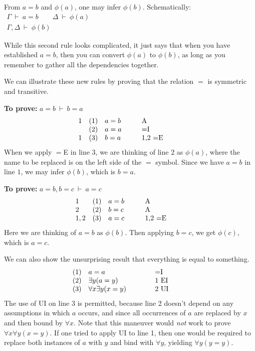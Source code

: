 \bigskip \begin{tcolorbox}[enhanced,width=10cm,title=Equality Elimination ({$=$}E),attach boxed title to top
  left={yshift=-2mm,xshift=4mm},boxed title style={sharp corners}]
  From $a=b$ and $\phi (a)$, one may infer $\phi (b)$.  Schematically:
  $ \begin{array}{c}
       \Gamma\:\vdash\: a=b \qquad \Delta\:\vdash\: \phi (a) \\ \hline
       \Gamma ,\Delta\:\vdash\: \phi (b) \end{array} $
 \end{tcolorbox}
 \noindent While this second rule looks complicated, it just says that
 when you have established $a=b$, then you can convert $\phi (a)$ to
 $\phi (b)$, as long as you remember to gather all the dependencies
 together.

We can illustrate these new rules by proving that the relation $=$ is
symmetric and transitive.

\medskip \noindent \textbf{To prove:} $a=b\:\vdash\: b=a$
\[ \begin{array}{l l >{$}p{1.5cm}<{$} p{2cm}}
     1 & (1) & a=b   & A \\
       & (2) & a=a   & $=$I \\
     1 & (3) & b=a   & 1,2 $=$E 
   \end{array} \]
When we apply $=$E in line 3, we are thinking of line 2 as $\phi (a)$,
where the name to be replaced is on the left side of the $=$ symbol.
Since we have $a=b$ in line $1$, we may infer $\phi (b)$, which is
$b=a$.

\medskip\noindent\textbf{To prove:} $a=b,b=c\:\vdash\: a=c$
\[ \begin{array}{l l >{$}p{1.5cm}<{$} p{2cm}}
     1 & (1) & a=b & A \\
     2 & (2) & b=c & A \\
     1,2 & (3) & a=c & 1,2 $=$E \end{array} \]
Here we are thinking of $a=b$ as $\phi (b)$.  Then applying $b=c$, we
get $\phi (c)$, which is $a=c$.

We can also show the unsurprising result that everything is equal to
something.
\[ \begin{array}{l l >{$}p{3cm}<{$} p{2cm}}
     & (1) & a=a & $=$I \\
     & (2) & \exists y(a=y) & 1 EI \\
     & (3) & \forall x\exists y(x=y) & 2 UI \end{array} \]
The use of UI on line 3 is permitted, because line 2 doesn't depend on
any assumptions in which $a$ occurs, and since all occurrences of $a$
are replaced by $x$ and then bound by $\forall x$.  Note that this
maneuver would {\it not} work to prove $\forall x\forall y(x=y)$.  If one
tried to apply UI to line 1, then one would be required to replace
both instances of $a$ with $y$ and bind with $\forall y$, yielding
$\forall y(y=y)$.

